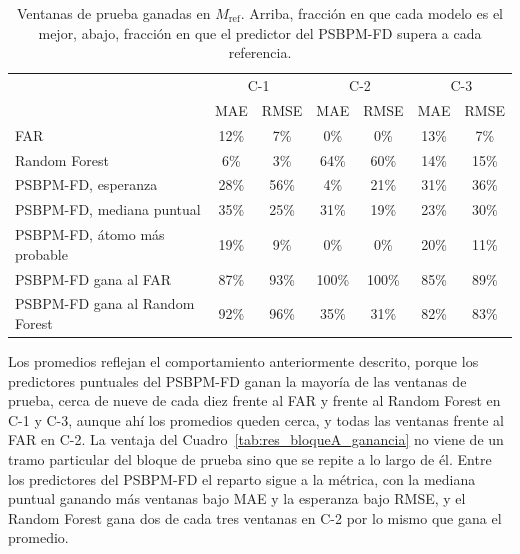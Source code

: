\begin{table}[H]
\centering\footnotesize
\caption{Ventanas de prueba ganadas en $M_{\mathrm{ref}}$. Arriba, fracción en que cada modelo es el mejor, abajo, fracción en que el predictor del PSBPM-FD supera a cada referencia.}
\label{tab:res_bloqueA_ventanas}
\begin{tabular}{l cc cc cc}
\hline
 & \multicolumn{2}{c}{C-1} & \multicolumn{2}{c}{C-2} & \multicolumn{2}{c}{C-3} \\
 & MAE & RMSE & MAE & RMSE & MAE & RMSE \\
\hline
FAR & 12\% & 7\% & 0\% & 0\% & 13\% & 7\% \\
Random Forest & 6\% & 3\% & 64\% & 60\% & 14\% & 15\% \\
PSBPM-FD, esperanza & 28\% & 56\% & 4\% & 21\% & 31\% & 36\% \\
PSBPM-FD, mediana puntual & 35\% & 25\% & 31\% & 19\% & 23\% & 30\% \\
PSBPM-FD, átomo más probable & 19\% & 9\% & 0\% & 0\% & 20\% & 11\% \\
\hline
PSBPM-FD gana al FAR & 87\% & 93\% & 100\% & 100\% & 85\% & 89\% \\
PSBPM-FD gana al Random Forest & 92\% & 96\% & 35\% & 31\% & 82\% & 83\% \\
\hline
\end{tabular}
\end{table}



Los promedios reflejan el comportamiento anteriormente descrito, porque los predictores puntuales del PSBPM-FD ganan la mayoría de las ventanas de prueba, cerca de nueve de cada diez frente al FAR y frente al Random Forest en C-1 y C-3, aunque ahí los promedios queden cerca, y todas las ventanas frente al FAR en C-2. La ventaja del Cuadro~\ref{tab:res_bloqueA_ganancia} no viene de un tramo particular del bloque de prueba sino que se repite a lo largo de él. Entre los predictores del PSBPM-FD el reparto sigue a la métrica, con la mediana puntual ganando más ventanas bajo MAE y la esperanza bajo RMSE, y el Random Forest gana dos de cada tres ventanas en C-2 por lo mismo que gana el promedio.


